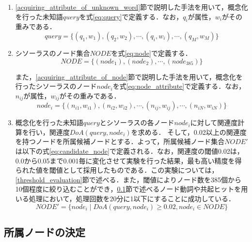 \documentclass[japanese]{jnlp_1.4}
\begin{document}
\begin{enumerate}
\item
 \ref{acquiring_attribute_of_unknown_word}節で説明した手法を用いて，概念化を行った未知語$\mathit{query}$を式\ref{eq:query}で定義する．なお，$q_i$が属性，$w_i$がその重みである．
 \begin{equation}
	\mathit{query}=\{(q_1,w_1),(q_2,w_2), \cdots, (q_i,w_i), \cdots, (q_M,w_M) \}
	\label{eq:query}
 \end{equation}

\item
 シソーラスのノード集合$\mathit{NODE}$を式\ref{eq:node}で定義する．
 \begin{equation}
	\mathit{NODE}=\{(\mathit{node}_1),(\mathit{node}_2), \cdots, (\mathit{node}_{385}) \}
	\label{eq:node}
 \end{equation}

また，\ref{acquiring_attribute_of_node}節で説明した手法を用いて，概念化を行ったシソーラスのノード$\mathit{node}_i$を式\ref{eq:node_attribute}で定義する．なお，$n_{ij}$が属性，$w_{ij}$がその重みである．
 \begin{equation}
	\mathit{node}_i=\{(n_{i1}, w_{i1}),(n_{i2}, w_{i2}), \cdots, (n_{ij}, w_{ij}), 
		\cdots, (n_{iN}, w_{iN}) \}
	\label{eq:node_attribute}
 \end{equation}

\item
 概念化を行った未知語$\mathit{query}$とシソーラスの各ノード$\mathit{node}_i$に対して関連度計算を行い，関連度$\mathit{DoA}(\mathit{query}, \mathit{node}_i)$を求める．
そして，0.02以上の関連度を持つノードを所属候補ノードとする．よって，所属候補ノード集合$\mathit{NODE}'$は以下の式\ref{eq:candidate_node}で定義される．なお，関連度の閾値0.02は，0.0から0.05まで0.001毎に変化させて実験を行った結果，最も高い精度を得られた値を閾値として採用したものである．この実験については，\ref{threshold_evaluation}節で述べる．また，閾値によりノード数を385個から10個程度に絞り込むことができ，\ref{determining_node}節で述べるノード動詞や共起ヒットを用いる処理において，処理回数を20分に1以下にすることに成功している．
 \begin{equation}
	\mathit{NODE}'=\{\mathit{node}_i \mid \mathit{DoA}(\mathit{query}, \mathit{node}_i) \ge 0.02, \mathit{node}_i \in \mathit{NODE}\}
	\label{eq:candidate_node}
 \end{equation}
\end{enumerate}


\subsection{所属ノードの決定}\label{determining_node}
\end{document}
